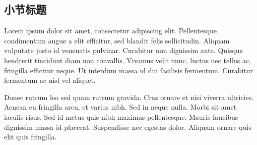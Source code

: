\documentclass[UTF8]{ctexart}  %
\begin{document}
\subsection{小节标题}

Lorem ipsum dolor sit amet, consectetur adipiscing elit. Pellentesque condimentum augue a elit efficitur, sed blandit felis sollicitudin. Aliquam vulputate justo id venenatis pulvinar. Curabitur non dignissim ante. Quisque hendrerit tincidunt diam non convallis. Vivamus velit nunc, luctus nec tellus ac, fringilla efficitur neque. Ut interdum massa id dui facilisis fermentum. Curabitur fermentum ac nisl vel aliquet.

Donec rutrum leo sed quam rutrum gravida. Cras ornare et nisi viverra ultricies. Aenean eu fringilla arcu, et varius nibh. Sed in neque nulla. Morbi sit amet iaculis risus. Sed id metus quis nibh maximus pellentesque. Mauris faucibus dignissim massa id placerat. Suspendisse nec egestas dolor. Aliquam ornare quis elit quis fringilla.
\end{document}
